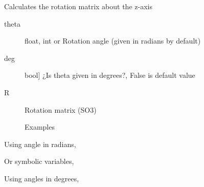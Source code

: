 \documentclass[letterpaper,10pt,english]{sphinxmanual}
\begin{document}
\begin{fulllineitems}
\label{\detokenize{_src/didactic:rkd.didactic.transformations.rotz}}
Calculates the rotation matrix about the z-axis
\begin{description}
\item[{theta}] \leavevmode{[}float, int or \sphinxtitleref{symbolic}{]}
Rotation angle (given in radians by default)

\item[{deg}] \leavevmode{[}bool{]}
¿Is theta given in degrees?, False is default value

\end{description}
\begin{description}
\item[{R}] \leavevmode{[}\sphinxtitleref{sympy.matrices.dense.MutableDenseMatrix}{]}
Rotation matrix (SO3)

Examples

\end{description}

Using angle in radians,

%
\begin{sphinxVerbatim}[commandchars=\\\{\}]
\end{sphinxVerbatim}

Or symbolic variables,

%
\begin{sphinxVerbatim}[commandchars=\\\{\}]
  
\end{sphinxVerbatim}

Using angles in degrees,

%
\begin{sphinxVerbatim}[commandchars=\\\{\}]
 
\end{sphinxVerbatim}

\end{fulllineitems}
\end{document}
